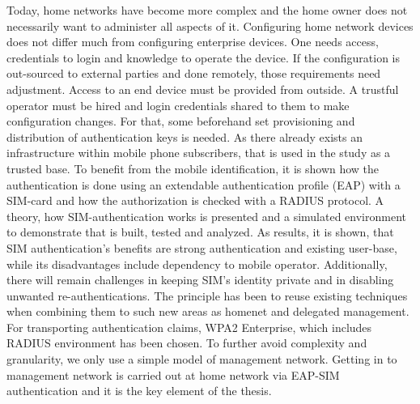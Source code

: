 \documentclass[12pt,a4paper,english]{tutthesis}
\begin{document}
Today, home networks have become more complex and the home owner 
does not necessarily want to administer all aspects of it.
Configuring home network devices does not differ much from configuring enterprise devices. One needs access, credentials to login and knowledge to operate the device. If the configuration is out-sourced to external parties and 
done remotely, those requirements need adjustment.
Access to an end device must be provided from outside. 
A trustful operator must be hired and login credentials shared to them to make configuration changes.
For that,  some beforehand set provisioning and distribution of authentication keys is needed.
As there already exists an infrastructure within mobile phone subscribers, that is used in the study as a trusted base.
To benefit from the mobile identification, it is shown how
the authentication is done using an extendable authentication profile (EAP) with a SIM-card
and how the authorization is checked with a RADIUS protocol.
A theory, how SIM-authentication works is presented and a simulated environment
to demonstrate that is built, tested and analyzed.
As results, it is shown, that SIM authentication's benefits are strong
authentication and existing user-base, while its disadvantages include
dependency to mobile operator. Additionally, there will remain challenges in keeping SIM's identity private and in disabling unwanted re-authentications. %
The principle has been to reuse existing techniques when combining them to such new areas as homenet and delegated management.
 For transporting authentication claims, WPA2 Enterprise, which includes RADIUS environment has been chosen.
To further avoid complexity and granularity, we
only use a simple model of management network. Getting in to management network is carried out at home network via EAP-SIM authentication and it is the key element of the thesis.



\end{document}
